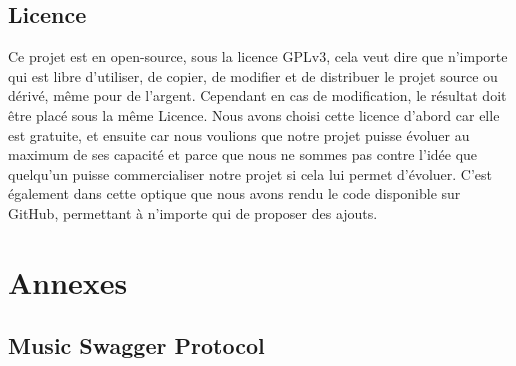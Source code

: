 \documentclass[12pt]{article}
\begin{document}
	\subsection{Licence}
	Ce projet est en open-source, sous la licence GPLv3, cela veut dire que n’importe qui est libre d’utiliser, de copier, de modifier et de distribuer le projet source ou dérivé, même pour de l’argent. Cependant en cas de modification, le résultat doit être placé sous la même Licence. Nous avons choisi cette licence d’abord car elle est gratuite, et ensuite car nous voulions que notre projet puisse évoluer au maximum de ses capacité et parce que nous ne sommes pas contre l’idée que quelqu’un puisse commercialiser notre projet si cela lui permet d’évoluer. C’est également dans cette optique que nous avons rendu le code disponible sur GitHub, permettant à n’importe qui de proposer des ajouts.
	\newpage
	\section*{Annexes}
	\subsection*{Music Swagger Protocol}
	\inputminted[breaklines]{text}{MusicSwaggerProtocol.txt}
	\newpage
\end{document}
